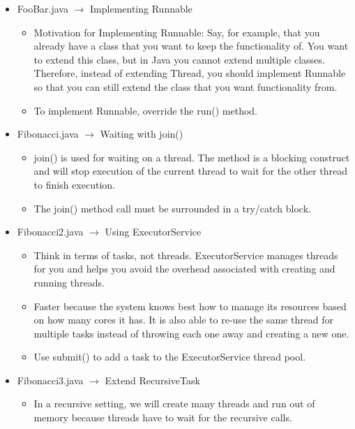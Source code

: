\documentclass[twoside]{article}
\begin{document}
\begin{itemize}
 \item FooBar.java $\rightarrow$ Implementing Runnable
 \begin{itemize}
  \item Motivation for Implementing Runnable: Say, for example, that you already have a class that you want to keep the functionality of. You want to extend this class, but in Java you cannot extend multiple classes. Therefore, instead of extending Thread, you should implement Runnable so that you can still extend the class that you want functionality from.
  \item To implement Runnable, override the run() method.
 \end{itemize}
 
 \item Fibonacci.java $\rightarrow$ Waiting with join()
 \begin{itemize}
  \item join() is used for waiting on a thread. The method is a blocking construct and will stop execution of the current thread to wait for the other thread to finish execution.
  \item The join() method call must be surrounded in a try/catch block.
 \end{itemize}

 \item Fibonacci2.java $\rightarrow$ Using ExecutorService
 \begin{itemize}
  \item Think in terms of tasks, not threads. ExecutorService manages threads for you and helps you avoid the overhead associated with creating and running threads.
  \item Faster because the system knows best how to manage its resources based on how many cores it has. It is also able to re-use the same thread for multiple tasks instead of throwing each one away and creating a new one.
  \item Use submit() to add a task to the ExecutorService thread pool.
 \end{itemize}

 \item Fibonacci3.java $\rightarrow$ Extend RecursiveTask
 \begin{itemize}
  \item In a recursive setting, we will create many threads and run out of memory because threads have to wait for the recursive calls.
 \end{itemize}
\end{itemize}
\end{document}
